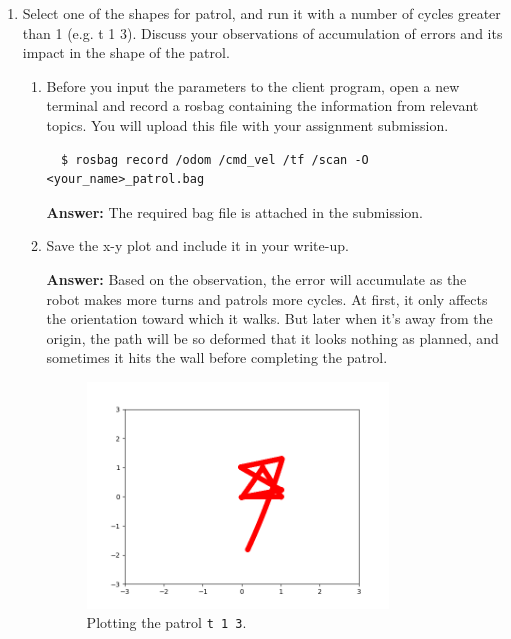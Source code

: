 \documentclass[12pt]{article}
\begin{document}
\begin{enumerate}
\begin{enumerate}
    \end{enumerate}

    \item Select one of the shapes for patrol, and run it with a number of cycles greater than 1 (e.g. t 1 3). Discuss your observations of accumulation of errors and its impact in the shape of the patrol.
    
    \begin{enumerate}

        \item Before you input the parameters to the client program, open a new terminal and record a rosbag containing the information from relevant topics. You will upload this file with your assignment submission.
        
\begin{verbatim}
  $ rosbag record /odom /cmd_vel /tf /scan -O <your_name>_patrol.bag
\end{verbatim}

        \textbf{Answer: }The required bag file is attached in the submission.
    
        \item Save the x-y plot and include it in your write-up.
        
        \textbf{Answer: }Based on the observation, the error will accumulate as the robot makes more turns and patrols more cycles. At first, it only affects the orientation toward which it walks. But later when it's away from the origin, the path will be so deformed that it looks nothing as planned, and sometimes it hits the wall before completing the patrol.

        \begin{figure}[H]
          \centering\includegraphics[width=8cm]{images/patrol_plot_3.png}\vspace{-10pt}
          \caption{Plotting the patrol \texttt{t 1 3}.}\label{fig:t_1_3}
          \end{figure}
        
    \end{enumerate}

\end{enumerate}
\end{document}
